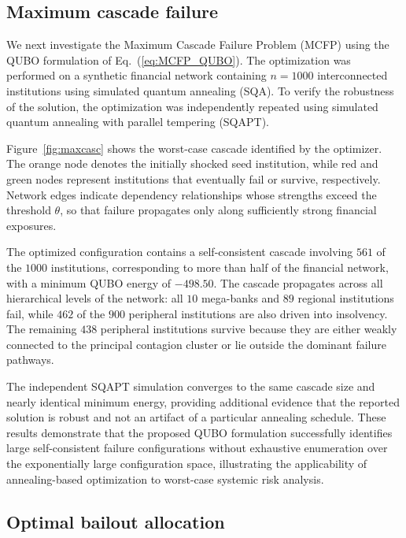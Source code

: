 \documentclass[aps,reprint,superscriptaddress,pra]{revtex4-2}
\begin{document}
\subsection{Maximum cascade failure}

We next investigate the Maximum Cascade Failure Problem (MCFP) using the QUBO formulation of Eq.~(\ref{eq:MCFP_QUBO}). The optimization was performed on a synthetic financial network containing $n=1000$ interconnected institutions using simulated quantum annealing (SQA). To verify the robustness of the solution, the optimization was independently repeated using simulated quantum annealing with parallel tempering (SQAPT).

Figure~\ref{fig:maxcasc} shows the worst-case cascade identified by the optimizer. The orange node denotes the initially shocked seed institution, while red and green nodes represent institutions that eventually fail or survive, respectively. Network edges indicate dependency relationships whose strengths exceed the threshold $\theta$, so that failure propagates only along sufficiently strong financial exposures.

The optimized configuration contains a self-consistent cascade involving $561$ of the $1000$ institutions, corresponding to more than half of the financial network, with a minimum QUBO energy of $-498.50$. The cascade propagates across all hierarchical levels of the network: all $10$ mega-banks and $89$ regional institutions fail, while $462$ of the $900$ peripheral institutions are also driven into insolvency. The remaining $438$ peripheral institutions survive because they are either weakly connected to the principal contagion cluster or lie outside the dominant failure pathways.

The independent SQAPT simulation converges to the same cascade size and nearly identical minimum energy, providing additional evidence that the reported solution is robust and not an artifact of a particular annealing schedule. These results demonstrate that the proposed QUBO formulation successfully identifies large self-consistent failure configurations without exhaustive enumeration over the exponentially large configuration space, illustrating the applicability of annealing-based optimization to worst-case systemic risk analysis.

\subsection{Optimal bailout allocation}
\end{document}

